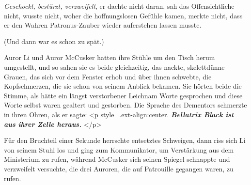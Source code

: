 \emph{Geschockt, bestürzt, verzweifelt}, er dachte nicht daran, sah das
Offensichtliche nicht, wusste nicht, woher die hoffnungslosen Gefühle kamen,
merkte nicht, dass er den Wahren Patronus-Zauber wieder auferstehen lassen
musste.

(Und dann war es schon zu spät.)

Auror Li und Auror McCusker hatten ihre Stühle um den Tisch herum umgestellt,
und so sahen sie es beide gleichzeitig, das nackte, skelettdünne Grauen, das
sich vor dem Fenster erhob und über ihnen schwebte, die Kopfschmerzen, die sie
schon von seinem Anblick bekamen. Sie hörten beide die Stimme, als hätte ein
längst verstorbener Leichnam Worte gesprochen und diese Worte selbst waren
gealtert und gestorben. Die Sprache des Dementors schmerzte in ihren Ohren, als
er sagte: <p style=\grqq{}.ext-align:center\grqq{}. \textbf{
}\textbf{\emph{\glqq{}Bellatrix Black ist aus ihrer Zelle heraus.\grqq{}} }</p>

Für den Bruchteil einer Sekunde herrschte entsetztes Schweigen, dann riss sich
Li von seinem Stuhl los und ging zum Kommunikator, um Verstärkung aus dem
Ministerium zu rufen, während McCusker sich seinen Spiegel schnappte und
verzweifelt versuchte, die drei Auroren, die auf Patrouille gegangen waren, zu
rufen.


